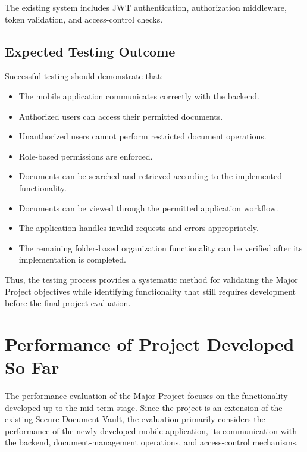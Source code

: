\documentclass[12pt]{article}
\begin{document}
The existing system includes JWT authentication, authorization middleware, token validation, and access-control checks.





\subsection{Expected Testing Outcome}

Successful testing should demonstrate that:

\begin{itemize}
    \item The mobile application communicates correctly with the backend.
    \item Authorized users can access their permitted documents.
    \item Unauthorized users cannot perform restricted document operations.
    \item Role-based permissions are enforced.
    \item Documents can be searched and retrieved according to the implemented functionality.
    \item Documents can be viewed through the permitted application workflow.
    \item The application handles invalid requests and errors appropriately.
    \item The remaining folder-based organization functionality can be verified after its implementation is completed.
\end{itemize}

Thus, the testing process provides a systematic method for validating the Major Project objectives while identifying functionality that still requires development before the final project evaluation.

\newpage


\section{Performance of Project Developed So Far}

The performance evaluation of the Major Project focuses on the functionality developed up to the mid-term stage. Since the project is an extension of the existing Secure Document Vault, the evaluation primarily considers the performance of the newly developed mobile application, its communication with the backend, document-management operations, and access-control mechanisms.
\end{document}
